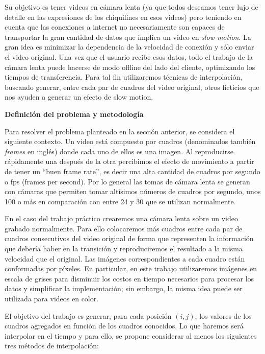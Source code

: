 Su objetivo es tener videos en cámara lenta (ya que todos deseamos tener lujo de detalle en las expresiones de los chiquilines en esos videos) pero teniendo en cuenta que las conexiones a internet no necesariamente son capaces de transportar la gran cantidad de datos que implica un video en \textit{slow motion}. La gran idea es minimizar la dependencia de la velocidad de conexi\'on y s\'olo enviar el video original. Una vez que el usuario recibe esos datos, todo el trabajo de la cámara lenta puede hacerse de modo offline del lado del cliente, optimizando los tiempos de transferencia. Para tal fin utilizaremos técnicas de interpolación, buscando generar, entre cada par de cuadros del video original, otros ficticios que nos ayuden a generar un efecto de slow motion.


\vskip 5pt

{\bf\noindent Definici\'on del problema y metodolog\'ia}

Para resolver el problema planteado en la secci\'on anterior, se considera el siguiente contexto. Un video está compuesto por cuadros (denominados también \textit{frames} en inglés) donde cada uno de ellos es una imagen. Al reproducirse rápidamente una después de la otra percibimos el efecto de movimiento a partir de tener un ``buen frame rate'', es decir una alta cantidad de cuadros por segundo o fps (frames per second). Por lo general las tomas de cámara lenta se generan con cámaras que permiten tomar altísimos números de cuadros por segundo, unos 100 o m\'as en comparaci\'on con entre 24 y 30 que se utilizan normalmente. 

En el caso del trabajo práctico crearemos una cámara lenta sobre un video grabado normalmente. Para ello colocaremos más cuadros entre cada par de cuadros consecutivos del video original de forma que representen la información que debería haber en la transición y reproduciremos el resultado a la misma velocidad que el original. Las im\'agenes correspondientes a cada cuadro est\'an conformadas por p\'ixeles. En particular, en este trabajo utilizaremos im\'agenes en escala de grises para disminuir los costos en tiempo necesarios para procesar los datos y simplificar la implementaci\'on; sin embargo, la misma idea puede ser utilizada para videos en color. 

El objetivo del trabajo es generar, para cada posici\'on $(i,j)$, los valores de los cuadros agregados en funci\'on de los cuadros conocidos. Lo que haremos ser\'a interpolar en el tiempo y para ello, se propone considerar al menos los siguientes tres m\'etodos de interpolaci\'on:

